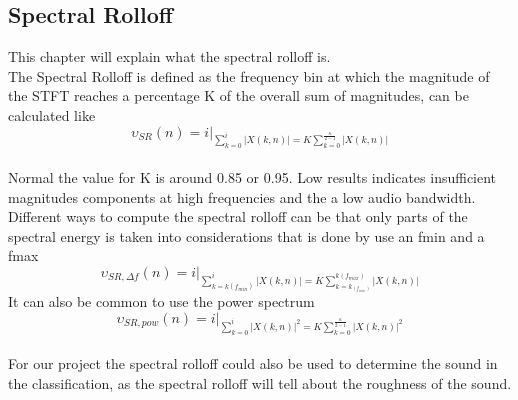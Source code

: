 \subsection{Spectral Rolloff}
This chapter will explain what the spectral rolloff is.\\
The Spectral Rolloff is defined as the frequency bin at which the magnitude of the STFT reaches a percentage K of the overall sum of magnitudes, can be calculated like\citep{ACA}\\
\begin{equation}\label{ eq:normal spectral rolloff}
	\upsilon_{SR}(n) = i \vert _{\displaystyle\sum_{k = 0}^i \vert X(k, n) \vert = K  \displaystyle\sum_{k = 0}^ {\frac{\kappa}{2-1}}\vert X(k, n) \vert}
\end{equation}
\\
Normal the value for K is around 0.85 or 0.95. Low results indicates insufficient magnitudes components at high frequencies and the a low audio bandwidth\citep{ACA}.\\
Different ways to compute the spectral rolloff can be that only parts of the spectral energy is taken into considerations that is done by use an fmin and a fmax\citep{ACA}
\begin{equation}\label{ eq: fmin and fmax spectral rolloff}
	\upsilon_{SR, \Delta f}(n) = i \vert _{\displaystyle\sum_{k = k(f_{min})}^i \vert X(k, n) \vert = K \displaystyle\sum_{k = k_(f_{min})}^ {k(f_{max})}\vert X(k, n) \vert}
\end{equation}
It can also be common to use the power spectrum
\begin{equation}\label{ eq:power spectral rolloff}
	\upsilon_{SR, pow}(n) = i \vert _{\displaystyle\sum_{k = 0}^i \vert X(k, n) \vert^2 = K \displaystyle\sum_{k= 0}^ {\frac{\kappa}{2-1}}\vert X(k, n) \vert^2}
\end{equation}
\\
For our project the spectral rolloff could also be used to determine the sound in the classification, as the spectral rolloff will tell about the roughness of the sound. 

